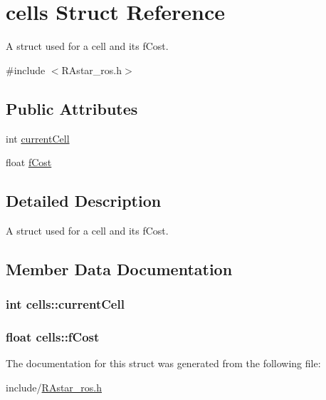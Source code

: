 \hypertarget{structcells}{\section{cells Struct Reference}
\label{structcells}
}


A struct used for a cell and its f\-Cost.  




{\ttfamily \#include $<$R\-Astar\-\_\-ros.\-h$>$}

\subsection*{Public Attributes}
\begin{DoxyCompactItemize}
\item 
int \hyperlink{structcells_a6eb77b36d9c07b3c27ad042f84f9a15c}{current\-Cell}
\item 
float \hyperlink{structcells_a4d0c0cf565b38ce72707d7d0dc2d7630}{f\-Cost}
\end{DoxyCompactItemize}


\subsection{Detailed Description}
A struct used for a cell and its f\-Cost. 

\subsection{Member Data Documentation}
\hypertarget{structcells_a6eb77b36d9c07b3c27ad042f84f9a15c}{
\subsubsection[{current\-Cell}]{\setlength{\rightskip}{0pt plus 5cm}int cells\-::current\-Cell}}\label{structcells_a6eb77b36d9c07b3c27ad042f84f9a15c}
\hypertarget{structcells_a4d0c0cf565b38ce72707d7d0dc2d7630}{
\subsubsection[{f\-Cost}]{\setlength{\rightskip}{0pt plus 5cm}float cells\-::f\-Cost}}\label{structcells_a4d0c0cf565b38ce72707d7d0dc2d7630}


The documentation for this struct was generated from the following file\-:\begin{DoxyCompactItemize}
\item 
include/\hyperlink{RAstar__ros_8h}{R\-Astar\-\_\-ros.\-h}\end{DoxyCompactItemize}
